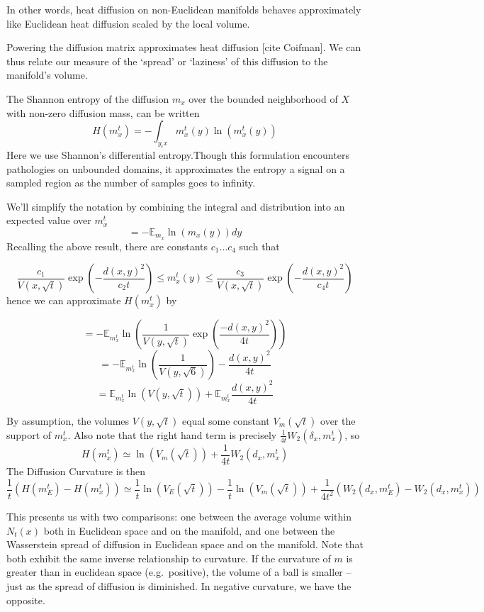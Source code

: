 \documentclass[
  letterpaper,
  DIV=11,
  numbers=noendperiod]{scrartcl}
\theoremstyle{plain}
\theoremstyle{plain}
\theoremstyle{definition}
\theoremstyle{plain}
\theoremstyle{definition}
\theoremstyle{remark}
\begin{document}
In other words, heat diffusion on non-Euclidean manifolds behaves
approximately like Euclidean heat diffusion scaled by the local volume.

Powering the diffusion matrix approximates heat diffusion {[}cite
Coifman{]}. We can thus relate our measure of the `spread' or `laziness'
of this diffusion to the manifold's volume.

The Shannon entropy of the diffusion \(m_{x}\) over the bounded
neighborhood of \(X\) with non-zero diffusion mass, can be written \[
H\left(m_x^t\right)=-\int_{y_\epsilon x} m_x^t(y) \ln \left(m_x^t(y)\right)
\] Here we use Shannon's differential entropy.Though this formulation
encounters pathologies on unbounded domains, it approximates the entropy
a signal on a sampled region as the number of samples goes to infinity.

We'll simplify the notation by combining the integral and distribution
into an expected value over \(m_{x}^t\) \[
=-\mathbb{E}_{m_x} \ln \left(m_x(y)\right) d y
\] Recalling the above result, there are constants \(c_{1}\dots c_{4}\)
such that

\[
\frac{c_1}{V(x, \sqrt{t})} \exp \left(-\frac{d(x, y)^2}{c_2 t}\right) \leq m_{x}^t(y) \leq \frac{c_3}{V(x, \sqrt{t})} \exp \left(-\frac{d(x, y)^2}{c_4 t}\right)
\] hence we can approximate \(H(m_{x}^t)\) by

\[
=-\mathbb{E}_{m_{x}^t} \ln \left(\frac{1}{V(y, \sqrt{t})} \exp \left(\frac{-d(x, y)^2}{4 t}\right)\right)
\] \[
=-\mathbb{E}_{m_x^t} \ln \left(\frac{1}{V(y, \sqrt{6})}\right)-\frac{d(x, y)^2}{4 t}
\] \[
=\mathbb{E}_{m_x^t} \ln (V(y, \sqrt{t}))+\mathbb{E}_{m_{x}^t} \frac{d(x, y)^2}{4 t}
\]

By assumption, the volumes \(V(y,\sqrt{ t })\) equal some constant
\(V_{m}(\sqrt{ t })\) over the support of \(m_{x}^t\). Also note that
the right hand term is precisely
\(\frac{1}{4t}W_{2}(\delta_{x}, m_{x}^t)\), so \[
H(m_{x}^t) \simeq \ln(V_{m}(\sqrt{ t })) + \frac{1}{4t}W_{2}(d_{x},m_{x}^t)
\] The Diffusion Curvature is then \[
\frac{1}{t}(H(m_{E}^t) - H(m_{x}^t)) \simeq \frac{1}{t}\ln(V_{E}(\sqrt{ t })) - \frac{1}{t}\ln(V_{m}(\sqrt{ t })) + \frac{1}{4t^2}( W_{2}(d_{x},m_{E}^t) - W_{2}(d_{x},m_{x}^t))
\]

This presents us with two comparisons: one between the average volume
within \(N_{t}(x)\) both in Euclidean space and on the manifold, and one
between the Wasserstein spread of diffusion in Euclidean space and on
the manifold. Note that both exhibit the same inverse relationship to
curvature. If the curvature of \(m\) is greater than in euclidean space
(e.g.~positive), the volume of a ball is smaller -- just as the spread
of diffusion is diminished. In negative curvature, we have the opposite.
\end{document}
